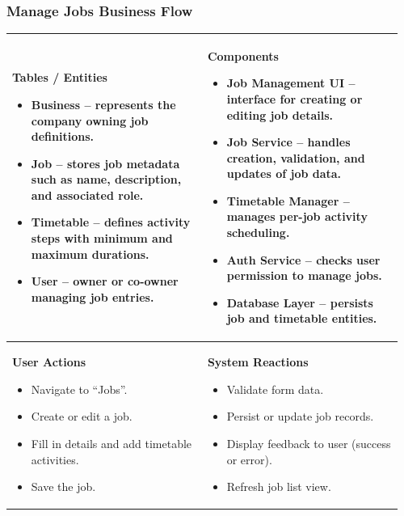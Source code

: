 \documentclass[]{VUMIFTemplateClass}
\newenvironment{mpitemlist}[1][\linewidth]{%
    \begin{minipage}[t]{#1}%
        \setlength{\leftmargini}{12pt}%
        \begin{itemize}%
            \setlength{\itemsep}{1pt}%
            \setlength{\parskip}{0pt}%
            \setlength{\parsep}{0pt}%
}{%
        \end{itemize}%
    \end{minipage}\newline
}
\begin{document}
\subsubsection{Manage Jobs Business Flow}
\begin{center}
\setlength{\tabcolsep}{8pt}
\renewcommand{\arraystretch}{1.3}
\begin{tabular}{|p{0.48\linewidth}|p{0.48\linewidth}|}
\hline
\textbf{Tables / Entities} \newline
\begin{mpitemlist}
\item \textbf{Business} – represents the company owning job definitions.
\item \textbf{Job} – stores job metadata such as name, description, and associated role.
\item \textbf{Timetable} – defines activity steps with minimum and maximum durations.
\item \textbf{User} – owner or co-owner managing job entries.
\end{mpitemlist}
&
\textbf{Components} \newline
\begin{mpitemlist}
\item \textbf{Job Management UI} – interface for creating or editing job details.
\item \textbf{Job Service} – handles creation, validation, and updates of job data.
\item \textbf{Timetable Manager} – manages per-job activity scheduling.
\item \textbf{Auth Service} – checks user permission to manage jobs.
\item \textbf{Database Layer} – persists job and timetable entities.
\end{mpitemlist}
\\ \hline
\textbf{User Actions} \newline
\begin{mpitemlist}
\item Navigate to “Jobs”.
\item Create or edit a job.
\item Fill in details and add timetable activities.
\item Save the job.
\end{mpitemlist}
&
\textbf{System Reactions} \newline
\begin{mpitemlist}
\item Validate form data.
\item Persist or update job records.
\item Display feedback to user (success or error).
\item Refresh job list view.
\end{mpitemlist}
\\ \hline
\end{tabular}
\end{center}
\end{document}
